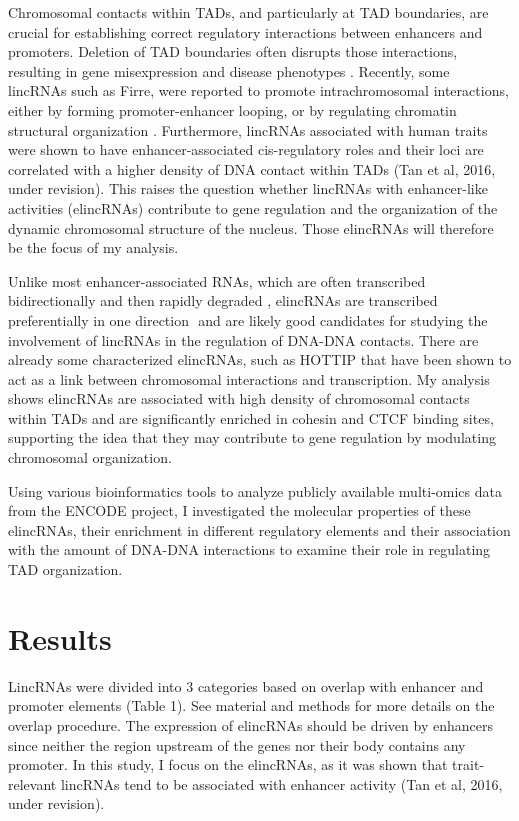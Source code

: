 \documentclass[10pt,a4paper]{report}
\begin{document}
Chromosomal contacts within TADs, and particularly at TAD boundaries, are crucial for establishing correct regulatory interactions between enhancers and promoters. Deletion of TAD boundaries often disrupts those interactions, resulting in gene misexpression and disease phenotypes \cite{Lupianez2016}⁠. Recently, some lincRNAs such as Firre, were reported to promote intrachromosomal interactions, either by forming promoter-enhancer looping, or by regulating chromatin structural organization \cite{Engreitz2016}⁠. Furthermore, lincRNAs associated with human traits were shown to have enhancer-associated cis-regulatory roles and their loci are correlated with a higher density of DNA contact within TADs (Tan et al, 2016, under revision). This raises the question whether lincRNAs with enhancer-like activities (elincRNAs) contribute to gene regulation and the organization of the dynamic chromosomal structure of the nucleus. Those elincRNAs will therefore be the focus of my analysis.


Unlike most enhancer-associated RNAs, which are often transcribed bidirectionally and then rapidly degraded \cite{Darrow2013}⁠, elincRNAs are transcribed preferentially in one direction \cite{Marques2013}⁠ and are likely good candidates for studying the involvement of lincRNAs in the regulation of DNA-DNA contacts. There are already some characterized elincRNAs, such as HOTTIP that have been shown to act as a link between chromosomal interactions and transcription. My analysis shows elincRNAs are associated with high density of chromosomal contacts within TADs and are significantly enriched in cohesin and CTCF binding sites, supporting the idea that they may contribute to gene regulation by modulating chromosomal organization.

Using various bioinformatics tools to analyze publicly available multi-omics data from the ENCODE project, I investigated the molecular properties of these elincRNAs, their enrichment in different regulatory elements and their association with the amount of DNA-DNA interactions to examine their role in regulating TAD organization.

\section*{Results}

LincRNAs were divided into 3 categories based on overlap with enhancer and promoter elements (Table 1). See material and methods for more details on the overlap procedure. The expression of elincRNAs should be driven by enhancers since neither the region upstream of the genes nor their body contains any promoter. In this study, I focus on the elincRNAs, as it was shown that trait-relevant lincRNAs tend to be associated with enhancer activity (Tan et al, 2016, under revision).
\end{document}
